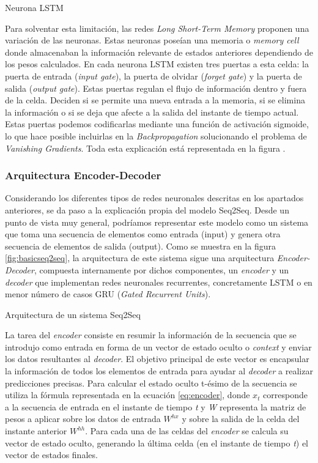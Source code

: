 %
{Neurona LSTM}

Para solventar esta limitación, las redes \textit{Long Short-Term Memory} proponen una variación de las neuronas. Estas neuronas poseían una memoria o \textit{memory cell} donde almacenaban la información relevante de estados anteriores dependiendo de los pesos calculados. En cada neurona LSTM existen tres puertas a esta celda: la puerta de entrada (\textit{input gate}), la puerta de olvidar (\textit{forget gate}) y la puerta de salida (\textit{output gate}). Estas puertas regulan el flujo de información dentro y fuera de la celda. Deciden si se permite una nueva entrada a la memoria, si se elimina la información o si se deja que afecte a la salida del instante de tiempo actual. Estas puertas podemos codificarlas mediante una función de activación sigmoide, lo que hace posible incluirlas en la \textit{Backpropagation} solucionando el problema de \textit{Vanishing Gradients}. Toda esta explicación está representada en la figura .


\subsubsection{Arquitectura Encoder-Decoder}
Considerando los diferentes tipos de redes neuronales descritas en los apartados anteriores, se da paso a la explicación propia del modelo Seq2Seq. Desde un punto de vista muy general, podríamos representar este modelo como un sistema que toma una secuencia de elementos como entrada (input) y genera otra secuencia de elementos de salida (output). Como se muestra en la figura \ref{fig:basicseq2seq}, la arquitectura de este sistema sigue una arquitectura \textit{Encoder-Decoder}, compuesta internamente por dichos componentes, un \textit{encoder} y un \textit{decoder} que implementan redes neuronales recurrentes, concretamente LSTM o en menor número de casos GRU (\textit{Gated Recurrent Units}).


%
{Arquitectura de un sistema Seq2Seq}

La tarea del \textit{encoder} consiste en resumir la información de la secuencia que se introdujo como entrada en forma de un vector de estado oculto o \textit{context} y enviar los datos resultantes al \textit{decoder}. El objetivo principal de este vector es encapsular la información de todos los elementos de entrada para ayudar al \textit{decoder} a realizar predicciones precisas. Para calcular el estado oculto t-ésimo de la secuencia se utiliza la fórmula representada en la ecuación \ref{eq:encoder}, donde  $x_t$ corresponde a la secuencia de entrada en el instante de tiempo \textit{t} y \textit{W} representa la matriz de pesos a aplicar sobre los datos de entrada $W^{hx}$ y sobre la salida de la celda del instante anterior $W^{hh}$. Para cada una de las celdas del \textit{encoder} se calcula su vector de estado oculto, generando la última celda (en el instante de tiempo \textit{t}) el vector de estados finales.

